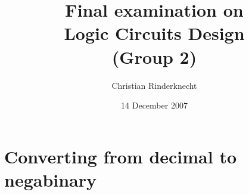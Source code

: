 \documentclass[11pt,a4paper]{article}
\title{Final examination on\\ Logic Circuits Design\\ (Group 2)}
\author{Christian Rinderknecht}
\date{14 December 2007}
\begin{document}
\maketitle
\thispagestyle{empty}

\allowdisplaybreaks

\section{Converting from decimal to negabinary}


\end{document}
